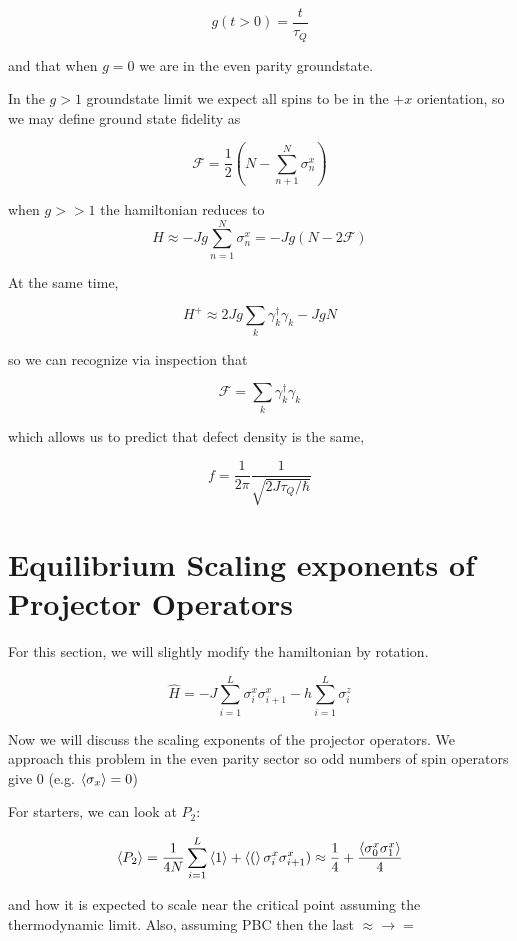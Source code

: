 \documentclass{article}
\begin{document}
$$g(t>0) = \frac{t}{\tau_Q}$$ 

and that when $g=0$ we are in the even parity groundstate.

In the $g>1$ groundstate limit we expect all spins to be in the $+x$ orientation, so we may define ground state fidelity as 

\begin{equation}
    \mathcal{F} = \frac{1}{2}(N - \sum _{n+1}^{N} \sigma^x_n)
\end{equation}

when $g>>1$ the hamiltonian reduces to $$H \approx -Jg \sum^N_{n=1} \sigma^x_n = -Jg(N-2\mathcal{F})$$

At the same time, 

$$H^{+} \approx 2Jg\sum_k \gamma^\dagger_k \gamma_k - JgN$$

so we can recognize via inspection that 

$$\mathcal{F} = \sum_k \gamma_k^\dagger \gamma_k$$

which allows us to predict that defect density is the same, 

\begin{equation}
    f = \frac{1}{2\pi} \frac{1}{\sqrt{2 J \tau_Q /\hbar}}
\end{equation}

\section{Equilibrium Scaling exponents of Projector Operators}

For this section, we will slightly modify the hamiltonian by rotation. 

\begin{equation}
    \hat{H} = -J \sum_{i=1}^{L} \sigma^{x}_{i} \sigma^{x}_{i+1} -h \sum_{i=1}^{L} \sigma^{z}_{i}
\end{equation}

Now we will discuss the scaling exponents of the projector operators. We approach this problem in the even parity sector so odd numbers of spin operators give 0 (e.g. $\braket{\sigma_x}=0$)

For starters, we can look at $P_2$:

\begin{equation}
    \braket{P_2} = \frac{1}{4N} \sum_{i=1}^{L} \braket{1} + \braket({\sigma^x_i \sigma^{x}_{i+1}}) \approx \frac{1}{4}+\frac{ 
        \braket{{\sigma^x_0 \sigma^{x}_{1}}}}{4}
\end{equation}

and how it is expected to scale near the critical point assuming the thermodynamic limit. Also, assuming PBC then the last $\approx \to =$
\end{document}
